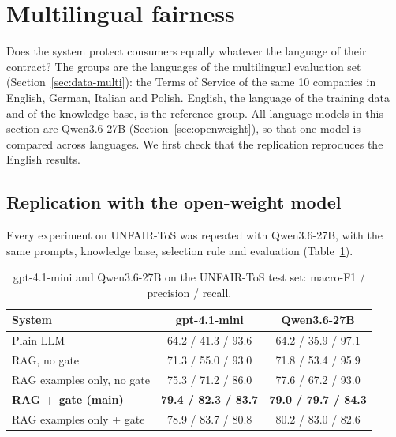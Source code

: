 \section{Multilingual fairness}
\label{sec:multilingual}

Does the system protect consumers equally whatever the language of their contract? The groups are the languages of the multilingual evaluation set (Section~\ref{sec:data-multi}): the Terms of Service of the same 10 companies in English, German, Italian and Polish. English, the language of the training data and of the knowledge base, is the reference group. All language models in this section are Qwen3.6-27B (Section~\ref{sec:openweight}), so that one model is compared across languages. We first check that the replication reproduces the English results.

\subsection{Replication with the open-weight model}

Every experiment on UNFAIR-ToS was repeated with Qwen3.6-27B, with the same prompts, knowledge base, selection rule and evaluation (Table~\ref{tab:replication}).

\begin{table}[ht]
\centering\small
\caption{gpt-4.1-mini and Qwen3.6-27B on the UNFAIR-ToS test set: macro-F1 / precision / recall.}
\label{tab:replication}
\begin{tabular}{@{}lcc@{}}
\toprule
System & gpt-4.1-mini & Qwen3.6-27B \\
\midrule
Plain LLM & 64.2 / 41.3 / 93.6 & 64.2 / 35.9 / 97.1 \\
RAG, no gate & 71.3 / 55.0 / 93.0 & 71.8 / 53.4 / 95.9 \\
RAG examples only, no gate & 75.3 / 71.2 / 86.0 & 77.6 / 67.2 / 93.0 \\
\textbf{RAG + gate (main)} & \textbf{79.4 / 82.3 / 83.7} & \textbf{79.0 / 79.7 / 84.3} \\
RAG examples only + gate & 78.9 / 83.7 / 80.8 & 80.2 / 83.0 / 82.6 \\
\bottomrule
\end{tabular}
\end{table}

